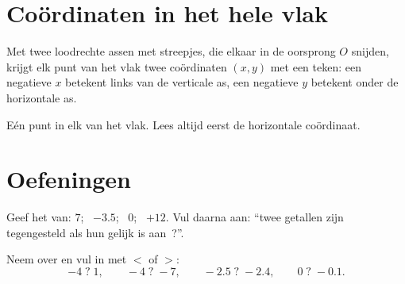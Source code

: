 \section{Coördinaten in het hele vlak}

\begin{definition}\label{def:g7:negatives:coords}
Met twee loodrechte assen met streepjes, die elkaar in de oorsprong $O$ snijden,
krijgt elk punt van het vlak twee coördinaten $(x, y)$ met een teken: een
negatieve $x$ betekent links van de verticale as, een negatieve $y$ betekent
onder de horizontale as.
\end{definition}

\begin{omfigure}

{\small Eén punt in elk  van het vlak. Lees altijd eerst de horizontale
coördinaat.}
\end{omfigure}

\section{Oefeningen}

\begin{exercise}[$\star$]\label{exo:g7:negatives:1}
Geef het  van: $7$; \ $-3.5$; \ $0$; \ $+12$. Vul daarna aan:
``twee getallen zijn tegengesteld als hun  gelijk is aan~?''.
\end{exercise}

\begin{exercise}[$\star$]\label{exo:g7:negatives:2}
Neem over en vul in met $<$ of $>$:
\[
-4 \;?\; 1, \qquad
-4 \;?\; -7, \qquad
-2.5 \;?\; -2.4, \qquad
0 \;?\; -0.1 .
\]
\end{exercise}

